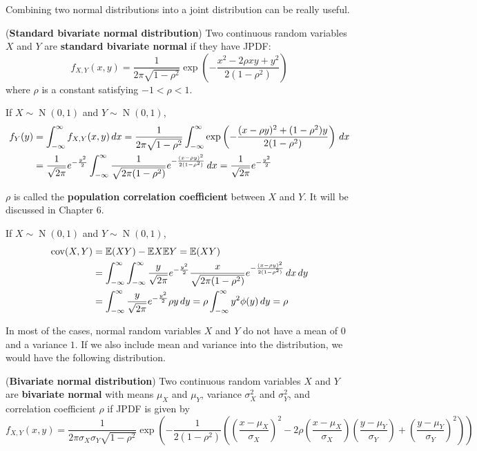 \documentclass{huhtakm-template-book}
\newcommand{\expect}{\mathbb{E}}
\DeclareMathOperator{\N}{N}
\DeclareMathOperator{\cov}{cov}
\begin{document}
Combining two normal distributions into a joint distribution can be really useful.
\begin{eg}(\textbf{Standard bivariate normal distribution}) 
	Two continuous random variables $X$ and $Y$ are \textbf{standard bivariate normal} if they have JPDF:
	\begin{equation*}
		f_{X,Y}(x,y)=\frac{1}{2\pi\sqrt{1-\rho^{2}}}\exp\left(-\frac{x^{2}-2\rho xy+y^{2}}{2(1-\rho^{2})}\right)
	\end{equation*}
	where $\rho$ is a constant satisfying $-1<\rho<1$.
\end{eg}
\begin{rem}
	If $X\sim\N(0,1)$ and $Y\sim\N(0,1)$,
	\begin{align*}
		f_{Y}(y)&=\int_{-\infty}^{\infty} f_{X,Y}(x,y)\,dx=\frac{1}{2\pi\sqrt{1-\rho^{2}}}\int_{-\infty}^{\infty}\exp\left(-\frac{(x-\rho y)^{2}+(1-\rho^{2})y}{2(1-\rho^{2})}\right)\,dx\\
		&=\frac{1}{\sqrt{2\pi}}e^{-\frac{y^{2}}{2}}\int_{-\infty}^{\infty}\frac{1}{\sqrt{2\pi(1-\rho^{2})}}e^{-\frac{(x-\rho y)^{2}}{2(1-\rho^{2})}}\,dx=\frac{1}{\sqrt{2\pi}}e^{-\frac{y^{2}}{2}}
	\end{align*}
\end{rem}
\begin{rem}
	$\rho$ is called the \textbf{population correlation coefficient} between $X$ and $Y$. It will be discussed in Chapter 6.
\end{rem}
\begin{rem}
	If $X\sim\N(0,1)$ and $Y\sim\N(0,1)$,
	\begin{align*}
		\cov(X,Y)&=\expect(XY)-\expect X\expect Y=\expect(XY)\\
		&=\intinfty\intinfty\frac{y}{\sqrt{2\pi}}e^{-\frac{y^{2}}{2}}\frac{x}{\sqrt{2\pi(1-\rho^{2})}}e^{-\frac{(x-\rho y)^{2}}{2(1-\rho^{2})}}\,dx\,dy\\
		&=\intinfty\frac{y}{\sqrt{2\pi}}e^{-\frac{y^{2}}{2}}\rho y\,dy=\rho\intinfty y^{2}\phi(y)\,dy=\rho
	\end{align*}
\end{rem}
In most of the cases, normal random variables $X$ and $Y$ do not have a mean of $0$ and a variance $1$. If we also include mean and variance into the distribution, we would have the following distribution.
\begin{eg}(\textbf{Bivariate normal distribution})
	Two continuous random variables $X$ and $Y$ are \textbf{bivariate normal} with means $\mu_{X}$ and $\mu_{Y}$, variance $\sigma_{X}^{2}$ and $\sigma_{Y}^{2}$, and correlation coefficient $\rho$ if JPDF is given by
	\begin{equation*}
		f_{X,Y}(x,y)=\frac{1}{2\pi\sigma_{X}\sigma_{Y}\sqrt{1-\rho^{2}}}\exp\left(-\frac{1}{2(1-\rho^{2})}\left(\left(\frac{x-\mu_{X}}{\sigma_{X}}\right)^{2}-2\rho\left(\frac{x-\mu_{X}}{\sigma_{X}}\right)\left(\frac{y-\mu_{Y}}{\sigma_{Y}}\right)+\left(\frac{y-\mu_{Y}}{\sigma_{Y}}\right)^{2}\right)\right)
	\end{equation*}
\end{eg}
\end{document}
